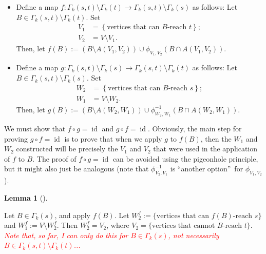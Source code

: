 \documentclass[numbers=enddot,12pt,final,onecolumn,notitlepage]{scrartcl}%
\theoremstyle{definition}
\newtheorem{lem}[theo]{Lemma}
\newenvironment{lemma}[1][]
{\begin{lem}[#1]\begin{leftbar}}
{\end{leftbar}\end{lem}}
\theoremstyle{plainsl}
\begin{document}
\begin{itemize}
\item Define a map $f:\Gamma_{k}\left(  s,t\right)  \setminus\Gamma_{k}\left(
t\right)  \rightarrow\Gamma_{k}\left(  s,t\right)  \setminus\Gamma_{k}\left(
s\right)  $ as follows: Let $B\in\Gamma_{k}\left(  s,t\right)  \setminus
\Gamma_{k}\left(  t\right)  $. Set%
\begin{align*}
V_{1}  &  =\left\{  \text{vertices that can }B\text{-reach }t\right\}  ;\\
V_{2}  &  =V\setminus V_{1}.
\end{align*}
Then, let $f\left(  B\right)  :=(B \setminus A(V_1,V_2)) \cup \phi_{V_1,V_2}(B \cap A(V_1,V_2))$. 

\item Define a map $g:\Gamma_{k}\left(  s,t\right)  \setminus\Gamma_{k}\left(
s\right)  \rightarrow\Gamma_{k}\left(  s,t\right)  \setminus\Gamma_{k}\left(
t\right)  $ as follows: Let $B\in\Gamma_{k}\left(  s,t\right)  \setminus
\Gamma_{k}\left(  s\right)  $. Set%
\begin{align*}
W_{2}  &  =\left\{  \text{vertices that can }B\text{-reach }s\right\}  ;\\
W_{1}  &  =V\setminus W_{2}.
\end{align*}
Then, let $g\left(  B\right)  := (B \setminus A(W_{2},W_{1})) \cup \phi_{W_{2},W_{1}}^{-1}\left( B \cap A(W_{2},W_{1})\right)  $.
\end{itemize}

We must show that $f\circ g=\operatorname*{id}$ and $g\circ
f=\operatorname*{id}$. Obviously, the main step for proving $g\circ
f=\operatorname*{id}$ is to prove that when we apply $g$ to $f\left(
B\right)  $, then the $W_{1}$ and $W_{2}$ constructed will be precisely the
$V_{1}$ and $V_{2}$ that were used in the application of $f$ to $B$. The proof
of $f\circ g=\operatorname*{id}$ can be avoided using the pigeonhole
principle, but it might also just be analogous (note that $\phi_{V_{2},V_{1}%
}^{-1}$ is \textquotedblleft another option\textquotedblright\ for
$\phi_{V_{1},V_{2}}$).

\begin{lemma}
    Let $B \in \Gamma_{k}(s)$, and apply $f(B)$. Let $W_{2}^{f} := \{\text{vertices that can $f(B)$-reach $s$}\}$ and $W_{1}^f := V \setminus W_{2}^f$. Then $W_{2}^f = V_{2}$, where $V_{2} = \{\text{vertices that cannot $B$-reach $t$}\}$. \textit{\textcolor{red}{Note that, so far, I can only do this for $B \in \Gamma_{k}(s)$, not necessarily $B \in \Gamma_{k}(s,t) \setminus \Gamma_{k}(t)$...}}
\end{lemma}
\end{document}
